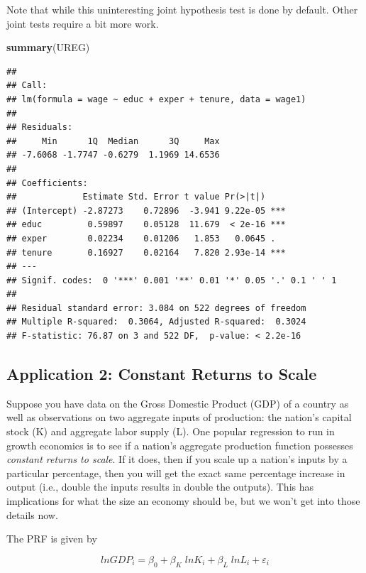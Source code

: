 \documentclass[
]{book}
\newenvironment{Shaded}{\begin{snugshade}}{\end{snugshade}}
\newcommand{\FunctionTok}[1]{\textcolor[rgb]{0.13,0.29,0.53}{\textbf{#1}}}
\newcommand{\NormalTok}[1]{#1}
\begin{document}
Note that while this uninteresting joint hypothesis test is done by default. Other joint tests require a bit more work.

\begin{Shaded}
\begin{Highlighting}[]
\FunctionTok{summary}\NormalTok{(UREG)}
\end{Highlighting}
\end{Shaded}

\begin{verbatim}
## 
## Call:
## lm(formula = wage ~ educ + exper + tenure, data = wage1)
## 
## Residuals:
##     Min      1Q  Median      3Q     Max 
## -7.6068 -1.7747 -0.6279  1.1969 14.6536 
## 
## Coefficients:
##             Estimate Std. Error t value Pr(>|t|)    
## (Intercept) -2.87273    0.72896  -3.941 9.22e-05 ***
## educ         0.59897    0.05128  11.679  < 2e-16 ***
## exper        0.02234    0.01206   1.853   0.0645 .  
## tenure       0.16927    0.02164   7.820 2.93e-14 ***
## ---
## Signif. codes:  0 '***' 0.001 '**' 0.01 '*' 0.05 '.' 0.1 ' ' 1
## 
## Residual standard error: 3.084 on 522 degrees of freedom
## Multiple R-squared:  0.3064, Adjusted R-squared:  0.3024 
## F-statistic: 76.87 on 3 and 522 DF,  p-value: < 2.2e-16
\end{verbatim}

\subsection*{Application 2: Constant Returns to Scale}\label{application-2-constant-returns-to-scale}

Suppose you have data on the Gross Domestic Product (GDP) of a country as well as observations on two aggregate inputs of production: the nation's capital stock (K) and aggregate labor supply (L). One popular regression to run in growth economics is to see if a nation's aggregate production function possesses \emph{constant returns to scale}. If it does, then if you scale up a nation's inputs by a particular percentage, then you will get the exact same percentage increase in output (i.e., double the inputs results in double the outputs). This has implications for what the size an economy should be, but we won't get into those details now.

The PRF is given by

\[lnGDP_i = \beta_0 + \beta_K \;lnK_i + \beta_L \;lnL_i + \varepsilon_i\]
\end{document}
